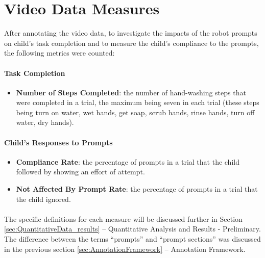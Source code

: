 \section{Video Data Measures}
\label{sec:measures}
After annotating the video data, to investigate the impacts of the robot prompts on child's task completion and to measure the child's compliance to the prompts, the following metrics were counted:

\paragraph{Task Completion}
\begin{itemize}
	\item \textbf{Number of Steps Completed}: the number of hand-washing steps that were completed in a trial, the maximum being seven in each trial (these steps being turn on water, wet hands, get soap, scrub hands, rinse hands, turn off water, dry hands).
\end{itemize}

\paragraph{Child's Responses to Prompts}
\begin{itemize}
	\item \textbf{Compliance Rate}: the percentage of prompts in a trial that the child followed by showing an effort of attempt.
	\item \textbf{Not Affected By Prompt Rate}: the percentage of prompts in a trial that the child ignored.
\end{itemize}


\paragraph{} %
The specific definitions for each measure will be discussed further in Section \ref{sec:QuantitativeData_results} -- Quantitative Analysis and Results - Preliminary.  The difference between the terms ``prompts'' and ``prompt sections'' was discussed in the previous section \ref{sec:AnnotationFramework} -- Annotation Framework.